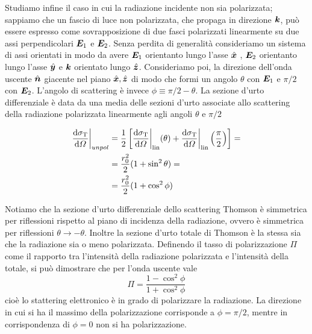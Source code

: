 Studiamo infine il caso in cui la radiazione incidente non sia polarizzata; 
sappiamo che un fascio di luce non polarizzata, che propaga in direzione $\V{k}$, può essere espresso come sovrapposizione di due fasci polarizzati linearmente su due assi perpendicolari $\V{E}_1$ e $\V{E}_2$. Senza perdita di generalità consideriamo un sistema di assi orientati in modo da avere $\V{E}_1$ orientanto lungo l'asse $\vers{x}$ , $\V{E}_2$ orientanto lungo l'asse $\vers{y}$  e $\V{k}$ orientato lungo $\vers{z}$. Consideriamo poi, la direzione dell'onda uscente $\vers{n}$ giacente nel piano $\vers{x}, \vers{z}$ di modo che formi un angolo $\theta$ con $\V{E}_1$ e $\pi/2$ con $\V{E}_2$. L'angolo di scattering è invece $\phi\equiv\pi/2-\theta$. La sezione d'urto differenziale è data da una media delle sezioni d'urto associate allo scattering della radiazione polarizzata linearmente agli angoli $\theta$ e $\pi/2$
\begin{EQ}
\begin{align}
\dfrac{\mathrm{d} {\sigma_\mathrm{T}}}{\mathrm{d} {\Omega}} \bigg|_{unpol} &= \dfrac{1}{2}\left[ \dfrac{\mathrm{d} {\sigma_\mathrm{T}}}{\mathrm{d} {\Omega}} \bigg|_\mathrm{lin}(\theta) + \dfrac{\mathrm{d} {\sigma_\mathrm{T}}}{\mathrm{d} {\Omega}} \bigg|_\mathrm{lin}\left(\dfrac{\pi}{2}\right) \right] = \\
&=\dfrac{r_0^2}{2} (1+\sin^2\theta) = \\
&=\dfrac{r_0^2}{2} (1+\cos^2\phi) \label{eq:Thomson4}
\end{align}
\end{EQ}
Notiamo che la sezione d'urto differenziale dello scattering Thomson è simmetrica per riflessioni rispetto al piano di incidenza della radiazione, ovvero è simmetrica per riflessioni $\theta\to -\theta$. Inoltre la sezione d'urto totale di Thomson è la stessa sia che la radiazione sia o meno polarizzata. Definendo il tasso di polarizzazione $\Pi$ come il rapporto tra l'intensità della radiazione polarizzata e l'intensità della totale, si può dimostrare \citep{book:Rybicki} che per l'onda uscente vale
\begin{equation}
\Pi = \dfrac{1-\cos^2\phi}{1+\cos^2\phi}
\end{equation}
cioè lo stattering elettronico è in grado di polarizzare la radiazione. La direzione in cui si ha il massimo della polarizzazione corrisponde a $\phi = \pi/2$, mentre in corrispondenza di $\phi=0$ non si ha polarizzazione.

